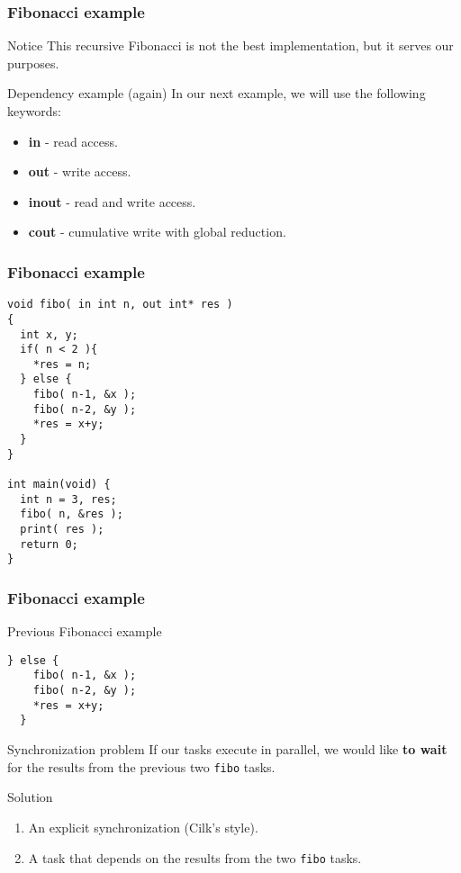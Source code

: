 \begin{frame}[fragile]
  \frametitle{Fibonacci example}
  \begin{alertblock}{Notice}
    This recursive Fibonacci is not the best implementation, but it serves our purposes.
  \end{alertblock}
  \pause
  \begin{exampleblock}{Dependency example (again)}
    In our next example, we will use the following keywords:
    \begin{itemize}
    \item \textbf{in} - read access.
    \item \textbf{out} - write access.
    \item \textbf{inout} - read and write access.
    \item \textbf{cout} - cumulative write with global reduction.
    \end{itemize}
  \end{exampleblock}
\end{frame}
\begin{frame}[fragile]
  \frametitle{Fibonacci example}
\begin{block}{}
\begin{lstlisting}
void fibo( in int n, out int* res )
{
  int x, y;
  if( n < 2 ){
    *res = n;
  } else {
    fibo( n-1, &x );
    fibo( n-2, &y );
    *res = x+y;
  }
}

int main(void) {
  int n = 3, res;
  fibo( n, &res );
  print( res );
  return 0;
}
\end{lstlisting}
\end{block}
%
%
\end{frame}
\begin{frame}[fragile]
  \frametitle{Fibonacci example}
\begin{block}{Previous Fibonacci example}
\begin{lstlisting}[firstnumber=6]
  } else {
    fibo( n-1, &x );
    fibo( n-2, &y );
    *res = x+y;
  }
\end{lstlisting}
\end{block}
%
\pause
%
\begin{alertblock}{Synchronization problem}
If our tasks execute in parallel, we would like \textbf{to wait} for the
results from the previous two \texttt{fibo} tasks.
\end{alertblock}
%
\pause
%
\begin{exampleblock}{Solution}
  \begin{enumerate}
  \item An explicit synchronization (Cilk's style).
  \item A task that depends on the results from the two \texttt{fibo} tasks.
  \end{enumerate}
\end{exampleblock}
%
\end{frame}
